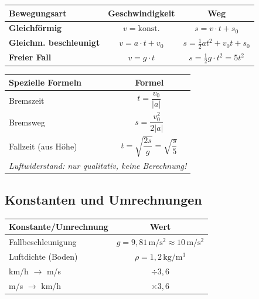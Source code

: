 \documentclass[11pt,a4paper]{article}
\begin{document}
\begin{center}
\renewcommand{\arraystretch}{1.6}
\begin{tabular}{|p{4cm}|c|c|}
\hline
\rowcolor{lightblue}
\textbf{Bewegungsart} & \textbf{Geschwindigkeit} & \textbf{Weg} \\
\hline
\textbf{Gleichförmig} & $v = \text{konst.}$ & $s = v \cdot t + s_0$ \\
\hline
\textbf{Gleichm. beschleunigt} & $v = a \cdot t + v_0$ & $s = \frac{1}{2}at^2 + v_0 t + s_0$ \\
\hline
\textbf{Freier Fall} & $v = g \cdot t$ & $s = \frac{1}{2}g \cdot t^2 = 5t^2$ \\
\hline
\end{tabular}
\end{center}

\vspace{0.5cm}

\begin{center}
\renewcommand{\arraystretch}{1.6}
\begin{tabular}{|l|c|}
\hline
\rowcolor{lightblue}
\textbf{Spezielle Formeln} & \textbf{Formel} \\
\hline
Bremszeit & $t = \dfrac{v_0}{|a|}$ \\
\hline
Bremsweg & $s = \dfrac{v_0^2}{2|a|}$ \\
\hline
Fallzeit (aus Höhe) & $t = \sqrt{\dfrac{2s}{g}} = \sqrt{\dfrac{s}{5}}$ \\
\hline
\hline
\multicolumn{2}{|l|}{\textit{Luftwiderstand: nur qualitativ, keine Berechnung!}} \\
\hline
\end{tabular}
\end{center}

\subsection{Konstanten und Umrechnungen}

\begin{center}
\begin{tabular}{|l|c|}
\hline
\rowcolor{lightblue}
\textbf{Konstante/Umrechnung} & \textbf{Wert} \\
\hline
Fallbeschleunigung & $g = 9{,}81\,\mathrm{m/s^2} \approx 10\,\mathrm{m/s^2}$ \\
\hline
Luftdichte (Boden) & $\rho = 1{,}2\,\mathrm{kg/m^3}$ \\
\hline
km/h $\rightarrow$ m/s & $\div 3{,}6$ \\
\hline
m/s $\rightarrow$ km/h & $\times 3{,}6$ \\
\hline
\end{tabular}
\end{center}
\end{document}
